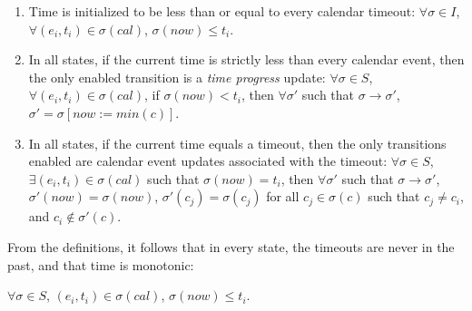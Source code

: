 \documentclass{llncs/llncs}
\begin{document}
\begin{enumerate}
\item \label{cal:a} Time is initialized to be less than or equal to every calendar timeout: $\forall \sigma \in I$, $\forall (e_i, t_i) \in \sigma(cal)$, $\sigma(now) \leq t_i$.


\item \label{cal:c} In all states, if the current time is strictly less than every calendar event, then the only enabled transition is a \emph{time progress} update: $\forall \sigma \in S$, $\forall (e_i, t_i) \in \sigma(cal)$, if $\sigma(now) < t_i$, then $\forall \sigma'$ such that $\sigma \rightarrow \sigma'$, $\sigma' = \sigma[now := min(c)]$.

\item \label{cal:d} In all states, if the current time equals a timeout, then the only transitions enabled are calendar event updates associated with the timeout: $\forall \sigma \in S$, $\exists (e_i, t_i) \in \sigma(cal)$ such that $\sigma(now) = t_i$, then $\forall \sigma'$ such that $\sigma \rightarrow \sigma'$, $\sigma'(now) = \sigma(now)$, $\sigma'(c_j) = \sigma(c_j)$ for all $c_j \in \sigma(c)$ such that $c_j \neq c_i$, and $c_i \notin \sigma'(c)$.

\end{enumerate}

From the definitions, it follows that in every state, the timeouts are never in the past, and that time is monotonic:

\begin{lemma}\label{lem:ft}
$\forall \sigma \in S$, $(e_i, t_i) \in \sigma(cal)$, $\sigma(now) \leq t_i$.
\end{lemma}
\end{document}
